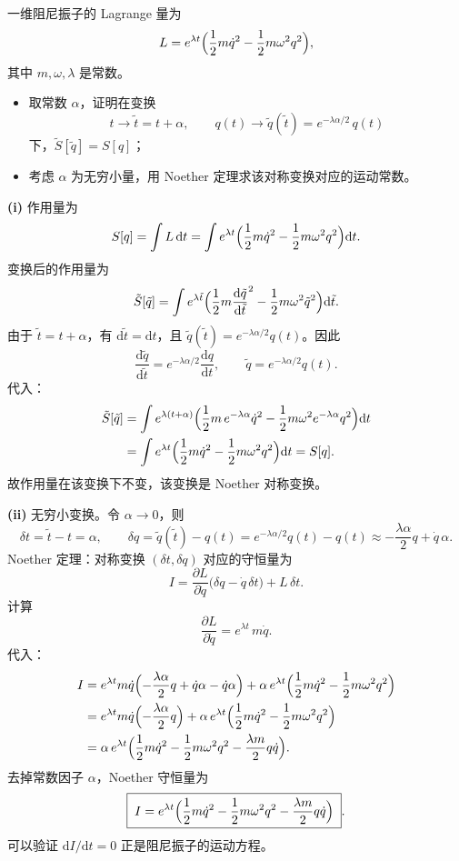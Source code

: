 \begin{question}
一维阻尼振子的 Lagrange 量为
\[
L = e^{\lambda t}\Bigl(\frac12 m\dot q^2 - \frac12 m\omega^2 q^2\Bigr),
\]
其中 \(m,\omega,\lambda\) 是常数。
\begin{itemize}
  \item[\textup{(i)}] 取常数 \(\alpha\)，证明在变换
  \[
  t \to \tilde t = t + \alpha,\qquad
  q(t) \to \tilde q(\tilde t) = e^{-\lambda\alpha/2}\, q(t)
  \]
  下，\(\tilde S[\tilde q] = S[q]\)；
  \item[\textup{(ii)}] 考虑 \(\alpha\) 为无穷小量，用 Noether 定理求该对称变换对应的运动常数。
\end{itemize}
\begin{solution}
\textbf{(i)} 作用量为
\[
S[q] = \int L\,\mathrm dt
= \int e^{\lambda t}\Bigl(\frac12 m\dot q^2 - \frac12 m\omega^2 q^2\Bigr)\mathrm dt .
\]
变换后的作用量为
\[
\tilde S[\tilde q] = \int e^{\lambda\tilde t}
\Bigl(\frac12 m\frac{\mathrm d\tilde q}{\mathrm d\tilde t}^2
- \frac12 m\omega^2 \tilde q^2\Bigr)\mathrm d\tilde t .
\]
由于 \(\tilde t = t + \alpha\)，有 \(\mathrm d\tilde t = \mathrm dt\)，且 \(\tilde q(\tilde t) = e^{-\lambda\alpha/2} q(t)\)。因此
\[
\frac{\mathrm d\tilde q}{\mathrm d\tilde t}
= e^{-\lambda\alpha/2}\frac{\mathrm d q}{\mathrm d t},
\qquad
\tilde q = e^{-\lambda\alpha/2} q(t) .
\]
代入：
\begin{align*}
\tilde S[\tilde q]
&= \int e^{\lambda(t+\alpha)}\Bigl(
\frac12 m\, e^{-\lambda\alpha}\dot q^2
- \frac12 m\omega^2 e^{-\lambda\alpha} q^2\Bigr)\mathrm dt \\
&= \int e^{\lambda t}\Bigl(\frac12 m\dot q^2 - \frac12 m\omega^2 q^2\Bigr)\mathrm dt
= S[q] .
\end{align*}
故作用量在该变换下不变，该变换是 Noether 对称变换。

\textbf{(ii)} 无穷小变换。令 \(\alpha \to 0\)，则
\[
\delta t = \tilde t - t = \alpha,\qquad
\delta q = \tilde q(\tilde t) - q(t) = e^{-\lambda\alpha/2} q(t) - q(t)
\approx -\frac{\lambda\alpha}{2} q + \dot q\,\alpha .
\]
Noether 定理：对称变换 \((\delta t,\delta q)\) 对应的守恒量为
\[
I = \frac{\partial L}{\partial\dot q}\bigl(\delta q - \dot q\,\delta t\bigr) + L\,\delta t .
\]
计算
\[
\frac{\partial L}{\partial\dot q} = e^{\lambda t}\, m\dot q .
\]
代入：
\begin{align*}
I &= e^{\lambda t} m\dot q\Bigl(-\frac{\lambda\alpha}{2} q + \dot q\alpha - \dot q\alpha\Bigr)
+ \alpha\, e^{\lambda t}\Bigl(\frac12 m\dot q^2 - \frac12 m\omega^2 q^2\Bigr) \\
&= e^{\lambda t} m\dot q\Bigl(-\frac{\lambda\alpha}{2} q\Bigr)
+ \alpha\, e^{\lambda t}\Bigl(\frac12 m\dot q^2 - \frac12 m\omega^2 q^2\Bigr) \\
&= \alpha\, e^{\lambda t}\Bigl(\frac12 m\dot q^2 - \frac12 m\omega^2 q^2
- \frac{\lambda m}{2} q\dot q\Bigr).
\end{align*}
去掉常数因子 \(\alpha\)，Noether 守恒量为
\[
\boxed{\;I = e^{\lambda t}\Bigl(\frac12 m\dot q^2 - \frac12 m\omega^2 q^2
- \frac{\lambda m}{2} q\dot q\Bigr)\;}.
\]
可以验证 \(\mathrm d I/\mathrm d t = 0\) 正是阻尼振子的运动方程。
\end{solution}
\end{question}

